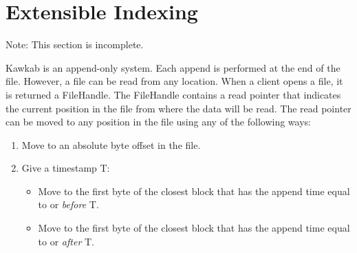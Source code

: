 \documentclass[]{article}
\newcommand{\subtopic}[1]{\vspace{1.5pt} \noindent \textbf{#1}}
\newcommand{\hl}[1]{\textcolor{hlcolor}{#1}}
\begin{document}
%





%

%

\section{Extensible Indexing}

\hl{Note: This section is incomplete.}

Kawkab is an append-only system. Each append is performed at the end of the file.
However, a file can be read from any location. When a client opens a file,
it is returned a FileHandle. The FileHandle contains a read pointer that indicates
the current position in the file from where the data will be read. The read
pointer can be moved to any position in the file using any of the following
ways: 

\begin{enumerate}
  \item Move to an absolute byte offset in the file.
  \item Give a timestamp T:
  \begin{itemize}
    \item Move to the first byte of the closest block that has the append time equal to
          or \textit{before} T.
    \item Move to the first byte of the closest block that has the append time equal to
          or \textit{after} T.
  \end{itemize}
\end{enumerate}
\end{document}
